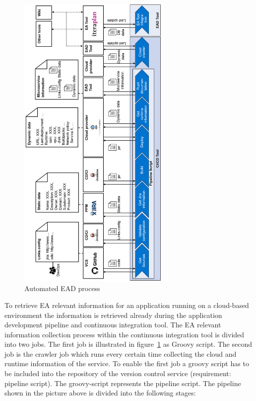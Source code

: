 \begin{figure}[htpb]
  \centering
  \includegraphics[width=0.65\textwidth]{figures/automated-ead-process-gedreht.png}
  \caption{Automated EAD process}
  \label{fig:Automated-EAD-process}
\end{figure}

To retrieve EA relevant information for an application running on a cloud-based environment the information is retrieved already during the application development pipeline and continuous integration tool. The EA relevant information collection process within the continuous integration tool is divided into two jobs. The first job is illustrated in figure~\ref{fig:Automated-EAD-process} as Groovy script. The second job is the crawler job which runs every certain time collecting the cloud and runtime information of the service. To enable the first job a groovy script has to be included into the repository of the version control service (requirement: pipeline script). The groovy-script represents the pipeline script. The pipeline shown in the picture above is divided into the following stages:

